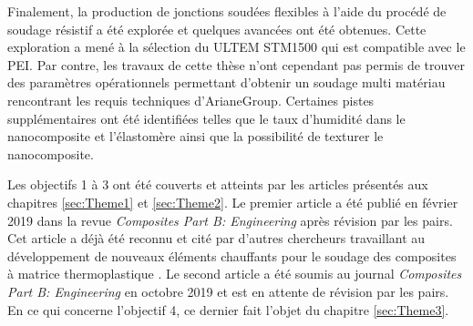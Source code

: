 Finalement, la production de jonctions soudées flexibles à l'aide du procédé de soudage résistif a été explorée et quelques avancées ont été obtenues. 
Cette exploration a mené à la sélection du ULTEM STM1500 qui est compatible avec le PEI. 
Par contre, les travaux de cette thèse n'ont cependant pas permis de trouver des paramètres opérationnels permettant d'obtenir un soudage multi matériau rencontrant les requis techniques d'ArianeGroup. 
Certaines pistes supplémentaires ont été identifiées telles que le taux d'humidité dans le nanocomposite et l'élastomère ainsi que la possibilité de texturer le nanocomposite. 

Les objectifs 1 à 3 ont été couverts et atteints par les articles présentés aux chapitres \ref{sec:Theme1} et \ref{sec:Theme2}. 
Le premier article \cite{Brassard2019a} a été publié en février 2019 dans la revue \textit{Composites Part B: Engineering} après révision par les pairs. 
Cet article a déjà été reconnu et cité par d'autres chercheurs travaillant au développement de nouveaux éléments chauffants pour le soudage des composites à matrice thermoplastique \cite{Russello2019}. 
Le second article a été soumis au journal \textit{Composites Part B: Engineering} en octobre 2019 et est en attente de révision par les pairs. 
En ce qui concerne l'objectif 4, ce dernier fait l'objet du chapitre \ref{sec:Theme3}. 